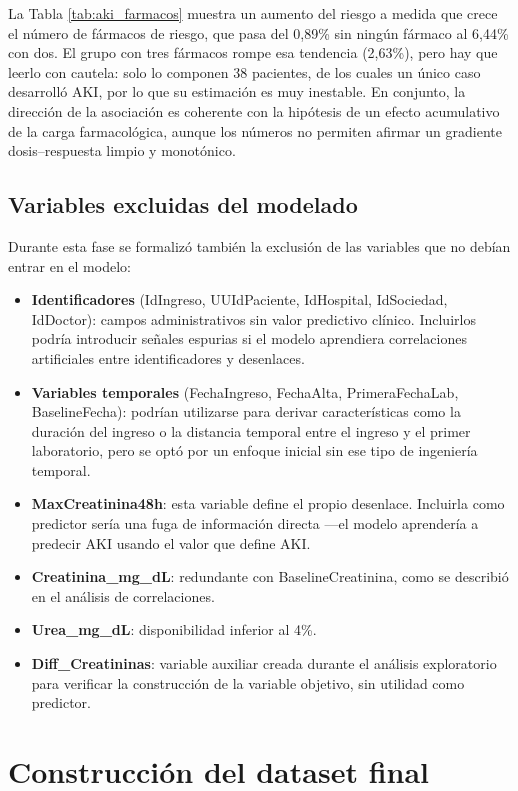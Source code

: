 \documentclass[12pt, a4paper, oneside]{report}
\begin{document}
La Tabla \ref{tab:aki_farmacos} muestra un aumento del riesgo a medida que crece el número de fármacos de riesgo, que pasa del 0,89\% sin ningún fármaco al 6,44\% con dos. El grupo con tres fármacos rompe esa tendencia (2,63\%), pero hay que leerlo con cautela: solo lo componen 38 pacientes, de los cuales un único caso desarrolló AKI, por lo que su estimación es muy inestable. En conjunto, la dirección de la asociación es coherente con la hipótesis de un efecto acumulativo de la carga farmacológica, aunque los números no permiten afirmar un gradiente dosis--respuesta limpio y monotónico.

\subsection{Variables excluidas del modelado}

Durante esta fase se formalizó también la exclusión de las variables que no debían entrar en el modelo:

\begin{itemize}
    \item \textbf{Identificadores} (IdIngreso, UUIdPaciente, IdHospital, IdSociedad, IdDoctor): campos administrativos sin valor predictivo clínico. Incluirlos podría introducir señales espurias si el modelo aprendiera correlaciones artificiales entre identificadores y desenlaces.
    \item \textbf{Variables temporales} (FechaIngreso, FechaAlta, PrimeraFechaLab, BaselineFecha): podrían utilizarse para derivar características como la duración del ingreso o la distancia temporal entre el ingreso y el primer laboratorio, pero se optó por un enfoque inicial sin ese tipo de ingeniería temporal.
    \item \textbf{MaxCreatinina48h}: esta variable define el propio desenlace. Incluirla como predictor sería una fuga de información directa —el modelo aprendería a predecir AKI usando el valor que define AKI.
    \item \textbf{Creatinina\_mg\_dL}: redundante con BaselineCreatinina, como se describió en el análisis de correlaciones.
    \item \textbf{Urea\_mg\_dL}: disponibilidad inferior al 4\%.
    \item \textbf{Diff\_Creatininas}: variable auxiliar creada durante el análisis exploratorio para verificar la construcción de la variable objetivo, sin utilidad como predictor.
\end{itemize}

\section{Construcción del dataset final}
\end{document}

